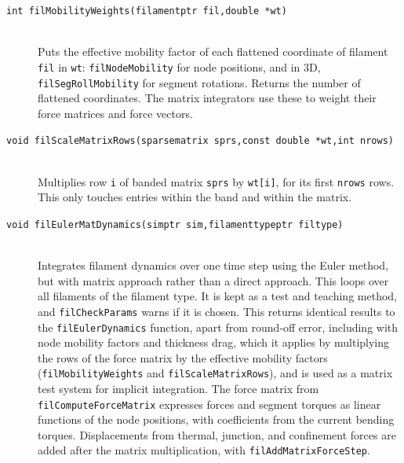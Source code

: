 \documentclass {scrbook}
\newcommand {\ttt} {\texttt}
\begin{document}
\begin{description}
\item[\ttt{int filMobilityWeights(filamentptr fil,double *wt)}]
\hfill \\
Puts the effective mobility factor of each flattened coordinate of filament \ttt{fil} in \ttt{wt}: \ttt{filNodeMobility} for node positions, and in 3D, \ttt{filSegRollMobility} for segment rotations. Returns the number of flattened coordinates. The matrix integrators use these to weight their force matrices and force vectors.

\item[\ttt{void filScaleMatrixRows(sparsematrix sprs,const double *wt,int nrows)}]
\hfill \\
Multiplies row \ttt{i} of banded matrix \ttt{sprs} by \ttt{wt[i]}, for its first \ttt{nrows} rows. This only touches entries within the band and within the matrix.

\item[\ttt{void filEulerMatDynamics(simptr sim,filamenttypeptr filtype)}]
\hfill \\
Integrates filament dynamics over one time step using the Euler method, but with matrix approach rather than a direct approach. This loops over all filaments of the filament type. It is kept as a test and teaching method, and \ttt{filCheckParams} warns if it is chosen. This returns identical results to the \ttt{filEulerDynamics} function, apart from round-off error, including with node mobility factors and thickness drag, which it applies by multiplying the rows of the force matrix by the effective mobility factors (\ttt{filMobilityWeights} and \ttt{filScaleMatrixRows}), and is used as a matrix test system for implicit integration. The force matrix from \ttt{filComputeForceMatrix} expresses forces and segment torques as linear functions of the node positions, with coefficients from the current bending torques. Displacements from thermal, junction, and confinement forces are added after the matrix multiplication, with \ttt{filAddMatrixForceStep}.


\end{description}
\end{document}
